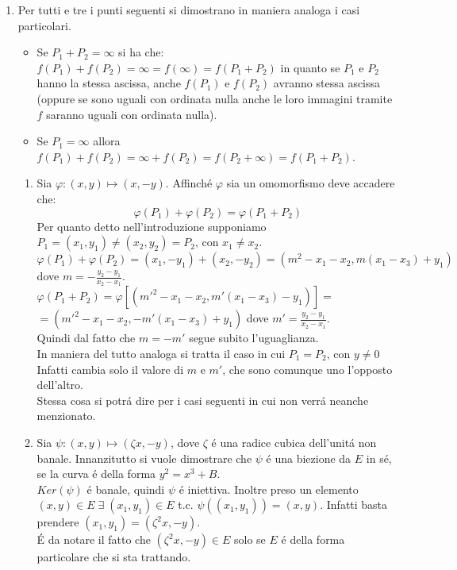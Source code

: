 \documentclass[a4paper]{article}
\newcommand{\ds}{\displaystyle}
\begin{document}
\begin{enumerate}
\item Per tutti e tre i punti seguenti si dimostrano in maniera analoga i casi particolari.
\begin{itemize}
\item Se $P_1+P_2=\infty$ si ha che:
$f(P_1)+f(P_2)=\infty=f(\infty)=f(P_1+P_2)$ in quanto se $P_1$ e $P_2$ hanno la stessa ascissa, anche
$f(P_1)$ e $f(P_2)$ avranno stessa ascissa (oppure se sono uguali con ordinata nulla anche le loro immagini tramite $f$ saranno uguali con ordinata nulla).
\item Se $P_1=\infty$ allora $f(P_1)+f(P_2)=\infty +f(P_2)=f(P_2+\infty)=f(P_1+P_2)$. 
\end {itemize}
\begin{enumerate}
\item Sia $\varphi: (x,y) \longmapsto (x,-y)$. Affinch\'e $\varphi$ sia un omomorfismo deve accadere che:
$$\varphi(P_1)+\varphi(P_2)=\varphi(P_1+P_2)$$
Per quanto detto nell'introduzione supponiamo $P_1=(x_1,y_1) \neq (x_2,y_2)=P_2$, con $x_1 \neq x_2$.\\
$\varphi(P_1)+\varphi(P_2)=(x_1,-y_1)+(x_2,-y_2)=(m^2-x_1-x_2,m(x_1-x_3)+y_1)$\\
dove $\ds{m=-\frac{y_2-y_1}{x_2-x_1}}$.\\
$\varphi(P_1+P_2)=\varphi[(m'^2-x_1-x_2,m'(x_1-x_3)-y_1)]=$\\
$=(m'^2-x_1-x_2,-m'(x_1-x_3)+y_1)$ dove $\ds{m'=\frac{y_2-y_1}{x_2-x_1}}$.\\
Quindi dal fatto che $m=-m'$ segue subito l'uguaglianza.\\
In maniera del tutto analoga si tratta il caso in cui $P_1=P_2$, con $y \neq 0$ \\
Infatti cambia solo il valore di $m$ e $m'$, che sono comunque uno l'opposto dell'altro.\\
Stessa cosa si potr\'a dire per i casi seguenti in cui non verr\'a neanche menzionato.\\
\item Sia $\psi: (x,y) \longmapsto (\zeta x, -y)$, dove $\zeta$ \'e una radice cubica dell'unit\'a non banale.
Innanzitutto si vuole dimostrare che $\psi$ \'e una biezione da $E$ in s\'e, se la curva \'e della forma $y^2=x^3+B$.\\
$Ker(\psi)$ \'e banale, quindi $\psi$ \'e iniettiva. Inoltre preso un elemento $(x,y)\in E \;\exists\;
(x_1,y_1)\in E$ t.c. $\psi((x_1,y_1))=(x,y)$. Infatti basta prendere $(x_1,y_1)=(\zeta^2 x,-y)$.\\
\'E da notare il fatto che $(\zeta^2 x,-y)\in E$ solo se $E$ \'e della forma particolare che si sta trattando.\\

\end{enumerate}
\end{enumerate}
\end{document}
